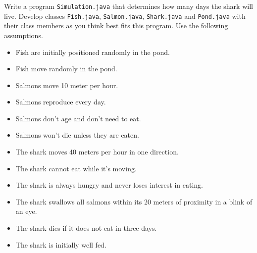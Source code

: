 \documentclass[12pt,letterpaper,twoside]{article}
\begin{document}
Write a program \texttt{Simulation.java} that determines how many days the shark will live. Develop classes \texttt{Fish.java}, \texttt{Salmon.java}, \texttt{Shark.java} and \texttt{Pond.java} with their class members as you think best fits this program. Use the following assumptions.
\begin{itemize}[itemsep=1mm] \parskip=0pt \parsep=0pt
\item[] Fish are initially positioned randomly in the pond.
\item[] Fish move randomly in the pond.
\item[] Salmons move 10 meter per hour.
\item[] Salmons reproduce every day.
\item[] Salmons don't age and don't need to eat.
\item[] Salmons won't die unless they are eaten.
\item[] The shark moves 40 meters per hour in one direction.
\item[] The shark cannot eat while it's moving.
\item[] The shark is always hungry and never loses interest in eating.
\item[] The shark swallows all salmons within its 20 meters of proximity in a blink of an eye.
\item[] The shark dies if it does not eat in three days.
\item[] The shark is initially well fed.
\end{itemize}

\end{document}
